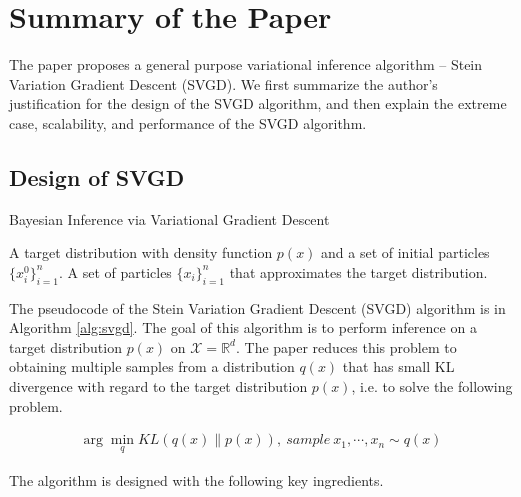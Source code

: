 \section{Summary of the Paper}

The paper proposes a general purpose variational inference algorithm -- Stein Variation Gradient Descent (SVGD).  We first summarize the author's justification for the design of the SVGD algorithm, and then explain the extreme case, scalability, and performance of the SVGD algorithm.

\subsection{Design of SVGD}

\begin{algorithm}[t!]
	\caption{Bayesian Inference via Variational Gradient Descent~\cite{ref_article_svgd}}
	\label{alg:svgd}
	\begin{algorithmic}
		 A target distribution with density function $p(x)$ and a set of initial particles $\{x_i^0\}_{i=1}^n$.
		 A set of particles $\{x_i\}_{i=1}^n$ that approximates the target distribution.
		\ENDFOR
	\end{algorithmic}
\end{algorithm}

The pseudocode of the Stein Variation Gradient Descent (SVGD) algorithm is in Algorithm \ref{alg:svgd}. The goal of this algorithm is to perform inference on a target distribution $p(x)$ on $\mathcal{X}=\mathbb{R}^d$. The paper reduces this problem to obtaining multiple samples from a distribution $q(x)$ that has small KL divergence with regard to the target distribution $p(x)$, i.e. to solve the following problem.

\begin{align}
    \arg\min_q KL(q(x)\lVert p(x)),\ sample\ x_1,\cdots,x_n\sim q(x)
\end{align}

The algorithm is designed with the following key ingredients.

